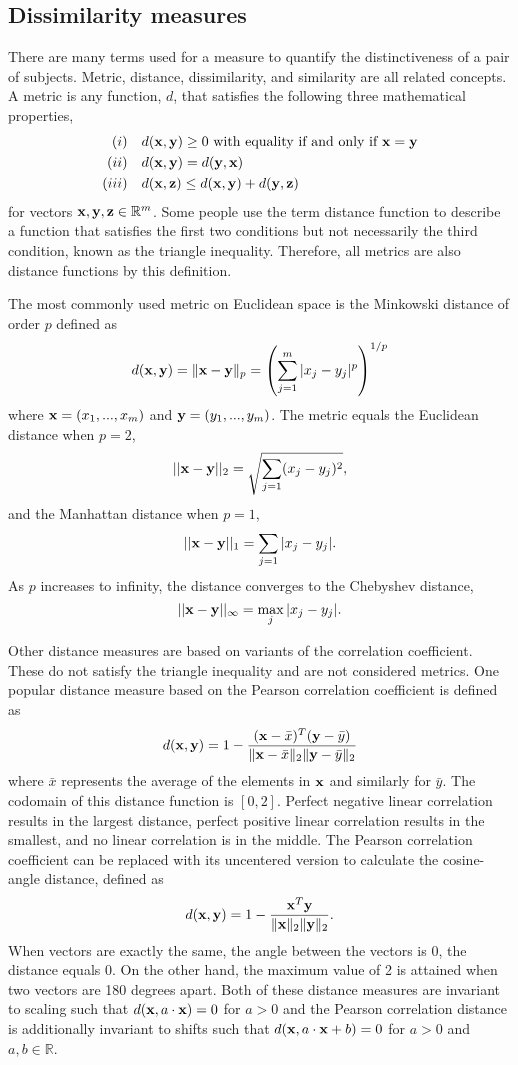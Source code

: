 \subsection{Dissimilarity measures}
There are many terms used for a measure to quantify the distinctiveness of a pair of subjects. Metric, distance, dissimilarity, and similarity are all related concepts. A metric is any function, $d$, that satisfies the following three mathematical properties,
\begin{align*}
(i)& \quad d(\mathbf x,\mathbf y)\geq 0 \text{ with equality if and only if }\mathbf x =\mathbf y\\
(ii)& \quad d(\mathbf x,\mathbf y) = d(\mathbf y,\mathbf x)\\
(iii)&\quad d(\mathbf x,\mathbf z) \leq d(\mathbf x,\mathbf y) + d(\mathbf y,\mathbf z)
\end{align*}
for vectors $\mathbf x,\mathbf y,\mathbf z \in\mathbb{R}^{m}$. Some people use the term distance function to describe a function that satisfies the first two conditions but not necessarily the third condition, known as the triangle inequality. Therefore, all metrics are also distance functions by this definition.

The most commonly used metric on Euclidean space is the Minkowski distance of order $p$ defined as
$$d(\mathbf x,\mathbf y) = \|\mathbf x - \mathbf y\|_{p} = \left(\sum^{m}_{j=1}|x_{j}-y_{j}|^{p}\right)^{1/p}$$
where $\mathbf x = (x_{1},...,x_{m})$ and $\mathbf y = (y_{1},...,y_{m})$. The metric equals the Euclidean distance when $p=2$,
$$||\mathbf x - \mathbf y||_{2}=\sqrt{\sum_{j=1}(x_{j}-y_{j})^{2}},$$
and the Manhattan distance when $p=1$,
$$||\mathbf x - \mathbf y||_{1}=\sum_{j=1}|x_{j}-y_{j}|.$$
As $p$ increases to infinity, the distance converges to the Chebyshev distance,
$$||\mathbf x - \mathbf y||_{\infty}=\max_{j}|x_{j}-y_{j}|.$$

Other distance measures are based on variants of the correlation coefficient. These do not satisfy the triangle inequality and are not considered metrics. One popular distance measure based on the Pearson correlation coefficient is defined as
$$d(\mathbf x,\mathbf y) =1 - \frac{(\mathbf x - \bar{x})^{T}(\mathbf y - \bar{y})}{\|\mathbf x - \bar{x}\|_{2}\|\mathbf y - \bar{y}\|_{2}}$$
where $\bar{x}$ represents the average of the elements in $\mathbf x$ and similarly for $\bar{y}$. The codomain of this distance function is $[0,2]$. Perfect negative linear correlation results in the largest distance, perfect positive linear correlation results in the smallest, and no linear correlation is in the middle. The Pearson correlation coefficient can be replaced with its uncentered version to calculate the cosine-angle distance, defined as
$$d(\mathbf x,\mathbf y) =1 - \frac{\mathbf x ^{T}\mathbf y }{\|\mathbf x\|_{2}\|\mathbf y \|_{2}}.$$
When vectors are exactly the same, the angle between the vectors is 0, the distance equals 0. On the other hand, the maximum value of 2 is attained when two vectors are 180 degrees apart. Both of these distance measures are invariant to scaling such that $d(\mathbf x, a\cdot \mathbf x) = 0$ for $a>0$ and the Pearson correlation distance is additionally invariant to shifts such that $d(\mathbf x, a\cdot \mathbf x +b) = 0$ for $a>0$ and $a,b\in \mathbb{R}$. 


